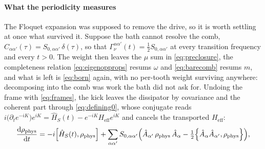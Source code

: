 \documentclass[a4paper,11pt]{article}
\newcommand{\eff}{\mathrm{eff}}
\begin{document}
\paragraph{What the periodicity measures}
The Floquet expansion was supposed to remove the drive, so it is worth settling at once what survived it. Suppose the bath cannot resolve the comb, $C_{\alpha\alpha'}(\tau) = S_{0,\alpha\alpha'}\,\delta(\tau)$, so that $\Gamma^{\alpha\alpha'}_\nu(t) = \tfrac12 S_{0,\alpha\alpha'}$ at every transition frequency and every $t>0$. The weight then leaves the $\mu$ sum in \eqref{eq:preclosure}, the completeness relation \eqref{eq:eigenopprops} resums $\omega$ and \eqref{eq:barecomb} resums $m$, and what is left is \eqref{eq:born} again, with no per-tooth weight surviving anywhere: decomposing into the comb was work the bath did not ask for. Undoing the frame with \eqref{eq:frames}, the kick leaves the dissipator by covariance and the coherent part through \eqref{eq:defining0}, whose conjugate reads $i\big(\partial_t e^{-iK}\big)e^{iK} = \hat H_S(t) - e^{-iK}H_\eff e^{iK}$ and cancels the transported $H_\eff$:
\begin{equation}\label{eq:flatbath}
  \dv{\rho_{\mathrm{phys}}}{t} = -i\comm{\hat H_S(t)}{\rho_{\mathrm{phys}}}
  + \sum_{\alpha\alpha'}S_{0,\alpha\alpha'}\Big(\hat A_{\alpha'}\,\rho_{\mathrm{phys}}\,\hat A_\alpha
  - \tfrac12\acomm{\hat A_\alpha \hat A_{\alpha'}}{\rho_{\mathrm{phys}}}\Big),
\end{equation}
\end{document}
